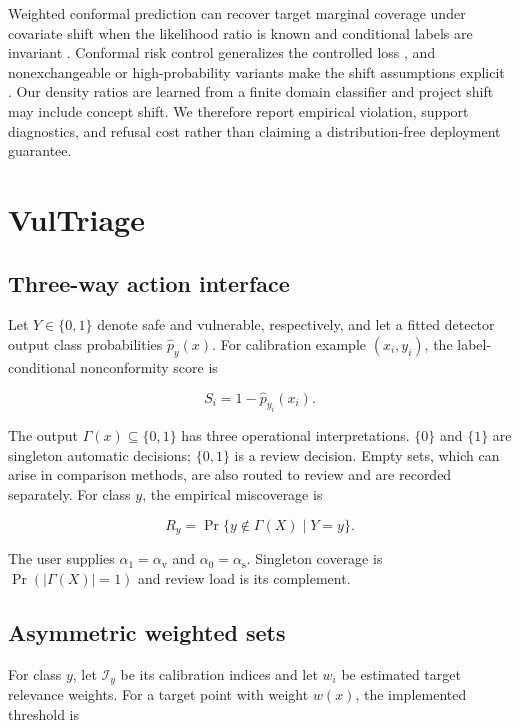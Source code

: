 \documentclass[research]{fcs}
\newcommand{\av}{\alpha_{\mathrm{v}}}
\newcommand{\as}{\alpha_{\mathrm{s}}}
\begin{document}
Weighted conformal prediction can recover target marginal coverage under covariate shift when the likelihood ratio is known and conditional labels are invariant \cite{tibshirani2019weightedcp}. Conformal risk control generalizes the controlled loss \cite{angelopoulos2024crc}, and nonexchangeable or high-probability variants make the shift assumptions explicit \cite{farinhas2024necrc,almeida2025hpcrc}. Our density ratios are learned from a finite domain classifier and project shift may include concept shift. We therefore report empirical violation, support diagnostics, and refusal cost rather than claiming a distribution-free deployment guarantee.

\section{VulTriage}

\subsection{Three-way action interface}

Let $Y\in\{0,1\}$ denote safe and vulnerable, respectively, and let a fitted detector output class probabilities $\widehat p_y(x)$. For calibration example $(x_i,y_i)$, the label-conditional nonconformity score is

\begin{equation}
 S_i=1-\widehat p_{y_i}(x_i).
\end{equation}

The output $\Gamma(x)\subseteq\{0,1\}$ has three operational interpretations. $\{0\}$ and $\{1\}$ are singleton automatic decisions; $\{0,1\}$ is a review decision. Empty sets, which can arise in comparison methods, are also routed to review and are recorded separately. For class $y$, the empirical miscoverage is

\begin{equation}
 R_y=\Pr\{y\notin\Gamma(X)\mid Y=y\}.
\end{equation}

The user supplies $\alpha_1=\av$ and $\alpha_0=\as$. Singleton coverage is $\Pr(|\Gamma(X)|=1)$ and review load is its complement.

\subsection{Asymmetric weighted sets}

For class $y$, let $\mathcal I_y$ be its calibration indices and let $w_i$ be estimated target relevance weights. For a target point with weight $w(x)$, the implemented threshold is
\end{document}
